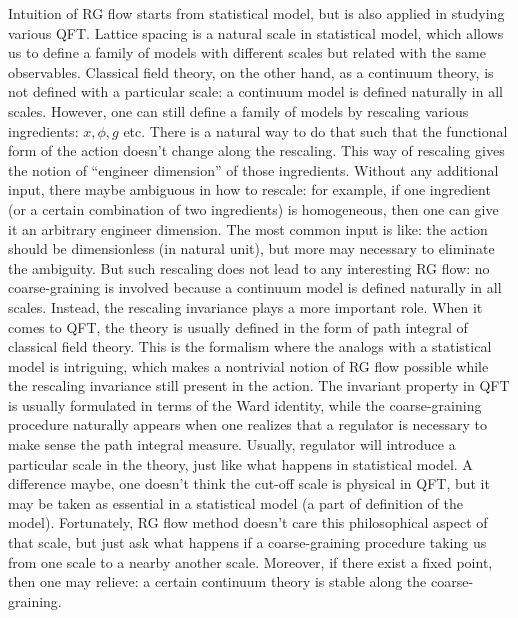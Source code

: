Intuition of RG flow starts from statistical model, 
but is also applied in studying various QFT. 
Lattice spacing is a natural scale in statistical model, 
which allows us to define a family of models with different scales but related with the same observables. 
Classical field theory, on the other hand, as a continuum theory, is not defined with a particular scale: 
a continuum model is defined naturally in all scales. 
However, one can still define a family of models by rescaling various ingredients: $x,\phi,g$ etc. 
There is a natural way to do that such that the functional form of the action doesn't change along the rescaling. 
This way of rescaling gives the notion of ``engineer dimension'' of those ingredients. 
Without any additional input, there maybe ambiguous in how to rescale: 
for example, if one ingredient (or a certain combination of two ingredients) is homogeneous, 
then one can give it an arbitrary engineer dimension. 
The most common input is like: the action should be dimensionless (in natural unit), 
but more may necessary to eliminate the ambiguity. 
But such rescaling does not lead to any interesting RG flow: 
no coarse-graining is involved because a continuum model is defined naturally in all scales. 
Instead, the rescaling invariance plays a more important role. 
When it comes to QFT, the theory is usually defined in the form of path integral of classical field theory. 
This is the formalism where the analogs with a statistical model is intriguing, 
which makes a nontrivial notion of RG flow possible while the rescaling invariance still present in the action. 
The invariant property in QFT is usually formulated in terms of the Ward identity, 
while the coarse-graining procedure naturally appears when one realizes that a regulator is necessary to make sense the path integral measure. 
Usually, regulator will introduce a particular scale in the theory, just like what happens in statistical model. 
A difference maybe, one doesn't think the cut-off scale is physical in QFT, but it may be taken as essential in a statistical model (a part of definition of the model). 
Fortunately, RG flow method doesn't care this philosophical aspect of that scale, but just ask what happens if a coarse-graining procedure taking us from one scale to a nearby another scale. 
Moreover, if there exist a fixed point, then one may relieve: a certain continuum theory is stable along the coarse-graining.


